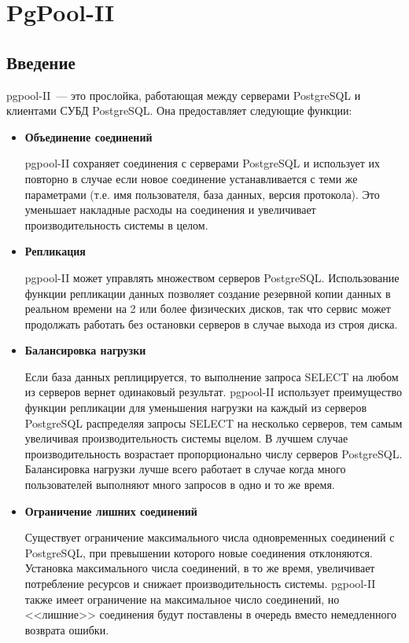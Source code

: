 \chapter{PgPool-II}
\begin{epigraphs}
\end{epigraphs}
\section{Введение}
pgpool-II~--- это прослойка, работающая между серверами PostgreSQL и клиентами СУБД PostgreSQL. 
Она предоставляет следующие функции:
\begin{itemize}
\item \textbf{Объединение соединений} 

pgpool-II сохраняет соединения с серверами PostgreSQL и использует их повторно в случае если новое 
соединение устанавливается с теми же параметрами (т.е. имя пользователя, база данных, версия протокола). 
Это уменьшает накладные расходы на соединения и увеличивает производительность системы в целом.

\item \textbf{Репликация} 

pgpool-II может управлять множеством серверов PostgreSQL. Использование функции репликации данных позволяет 
создание резервной копии данных в реальном времени на  2 или более физических дисков, так что сервис может 
продолжать работать без остановки серверов в случае выхода из строя диска.

\item \textbf{Балансировка нагрузки}

Если база данных реплицируется, то выполнение запроса SELECT на любом из серверов вернет одинаковый результат. 
pgpool-II использует преимущество функции репликации для уменьшения нагрузки на каждый из серверов PostgreSQL 
распределяя запросы SELECT на несколько серверов, тем самым увеличивая производительность системы вцелом. 
В лучшем случае производительность возрастает пропорционально числу серверов PostgreSQL. Балансировка нагрузки 
лучше всего работает в случае когда много пользователей выполняют много запросов в одно и то же время.

\item \textbf{Ограничение лишних соединений}

Существует ограничение максимального числа одновременных соединений с PostgreSQL, при превышении которого новые 
соединения отклоняются. Установка максимального числа соединений, в то же время, увеличивает потребление ресурсов и 
снижает производительность системы. pgpool-II также имеет ограничение на максимальное число соединений, но <<лишние>> 
соединения будут поставлены в очередь вместо немедленного возврата ошибки.


\end{itemize}
